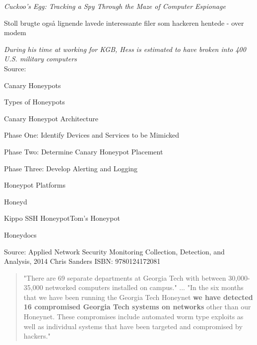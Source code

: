 \documentclass[Screen16to9,17pt]{foils}
\begin{document}

\begin{list1}
\item
\emph{Cuckoo's Egg: Tracking a Spy Through the Maze of Computer
 Espionage}
 \item  Stoll brugte også lignende lavede interessante filer som hackeren hentede - over modem
\item \emph{During his time at working for KGB, Hess is estimated to have broken into 400 U.S. military computers}\\
Source: 
\end{list1}



\begin{list1}
\item Canary Honeypots
\item Types of Honeypots
\item Canary Honeypot Architecture
\begin{list2}
\item Phase One: Identify Devices and Services to be Mimicked
\item Phase Two: Determine Canary Honeypot Placement
\item Phase Three: Develop Alerting and Logging
\end{list2}
\item Honeypot Platforms
\begin{list2}
\item Honeyd
\item Kippo SSH HoneypotTom’s Honeypot
\item Honeydocs
\end{list2}
\end{list1}

Source: Applied Network Security Monitoring Collection, Detection, and Analysis, 2014 Chris Sanders ISBN: 9780124172081


\begin{quote}
\small
"There are 69 separate departments at Georgia Tech with between 30,000-35,000
networked computers installed on campus."
...
"In the six months that we have been running the Georgia
Tech Honeynet {\bfseries we have detected 16 compromised
Georgia Tech systems on networks} other than our
Honeynet. These compromises include automated worm
type exploits as well as individual systems that have been
targeted and compromised by hackers."
\end{quote}
\end{document}
